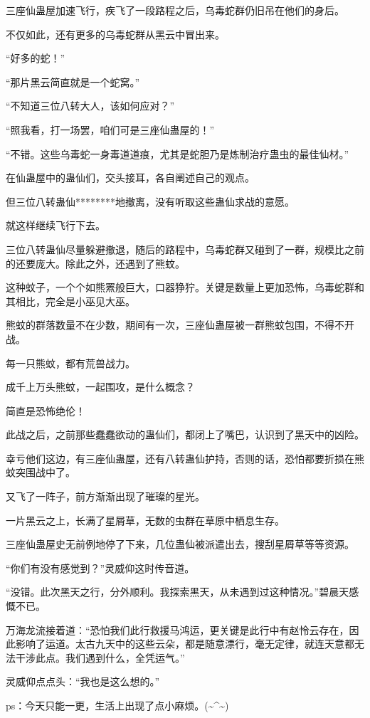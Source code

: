 \begin{this_body}
三座仙蛊屋加速飞行，疾飞了一段路程之后，乌毒蛇群仍旧吊在他们的身后。

不仅如此，还有更多的乌毒蛇群从黑云中冒出来。

“好多的蛇！”

“那片黑云简直就是一个蛇窝。”

“不知道三位八转大人，该如何应对？”

“照我看，打一场罢，咱们可是三座仙蛊屋的！”

“不错。这些乌毒蛇一身毒道道痕，尤其是蛇胆乃是炼制治疗蛊虫的最佳仙材。”

在仙蛊屋中的蛊仙们，交头接耳，各自阐述自己的观点。

但三位八转蛊仙********地撤离，没有听取这些蛊仙求战的意愿。

就这样继续飞行下去。

三位八转蛊仙尽量躲避撤退，随后的路程中，乌毒蛇群又碰到了一群，规模比之前的还要庞大。除此之外，还遇到了熊蚊。

这种蚊子，一个个如熊罴般巨大，口器狰狞。关键是数量上更加恐怖，乌毒蛇群和其相比，完全是小巫见大巫。

熊蚊的群落数量不在少数，期间有一次，三座仙蛊屋被一群熊蚊包围，不得不开战。

每一只熊蚊，都有荒兽战力。

成千上万头熊蚊，一起围攻，是什么概念？

简直是恐怖绝伦！

此战之后，之前那些蠢蠢欲动的蛊仙们，都闭上了嘴巴，认识到了黑天中的凶险。

幸亏他们这边，有三座仙蛊屋，还有八转蛊仙护持，否则的话，恐怕都要折损在熊蚊突围战中了。

又飞了一阵子，前方渐渐出现了璀璨的星光。

一片黑云之上，长满了星屑草，无数的虫群在草原中栖息生存。

三座仙蛊屋史无前例地停了下来，几位蛊仙被派遣出去，搜刮星屑草等等资源。

“你们有没有感觉到？”灵威仰这时传音道。

“没错。此次黑天之行，分外顺利。我探索黑天，从未遇到过这种情况。”碧晨天感慨不已。

万海龙流接着道：“恐怕我们此行救援马鸿运，更关键是此行中有赵怜云存在，因此影响了运道。太古九天中的这些云朵，都是随意漂行，毫无定律，就连天意都无法干涉此点。我们遇到什么，全凭运气。”

灵威仰点点头：“我也是这么想的。”

ps：今天只能一更，生活上出现了点小麻烦。(\~{}\^{}\~{})

\end{this_body}

